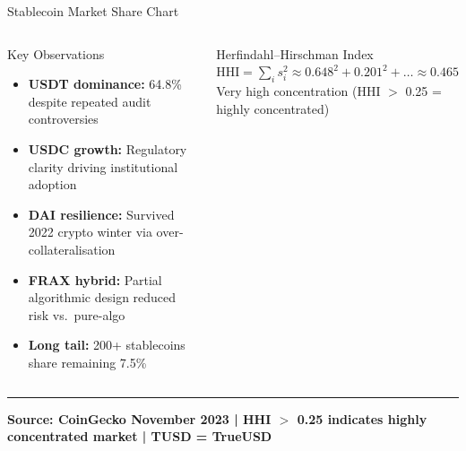 \documentclass[8pt,aspectratio=169]{beamer}
\newcommand{\bottomnote}[1]{\vfill\vspace{-2mm}\textcolor{mllavender2}{\rule{\textwidth}{0.4pt}}\vspace{1mm}\footnotesize\textbf{#1}}
\begin{document}
\begin{frame}{Stablecoin Market Share Chart}
\begin{columns}[T]
\begin{block}{Key Observations}
\begin{itemize}\setlength{\itemsep}{3pt}
  \item \textbf{USDT dominance:} 64.8\% despite repeated audit controversies
  \item \textbf{USDC growth:} Regulatory clarity driving institutional adoption
  \item \textbf{DAI resilience:} Survived 2022 crypto winter via over-collateralisation
  \item \textbf{FRAX hybrid:} Partial algorithmic design reduced risk vs.\ pure-algo
  \item \textbf{Long tail:} 200+ stablecoins share remaining 7.5\%
\end{itemize}
\end{block}
\vspace{2mm}
\begin{block}{Herfindahl--Hirschman Index}
\scriptsize $\text{HHI} = \sum_i s_i^2 \approx 0.648^2 + 0.201^2 + \ldots \approx 0.465$\\
Very high concentration (HHI $>$ 0.25 = highly concentrated)
\end{block}
\end{columns}
\bottomnote{Source: CoinGecko November 2023 | HHI $>$ 0.25 indicates highly concentrated market | TUSD = TrueUSD}
\end{frame}
\end{document}
